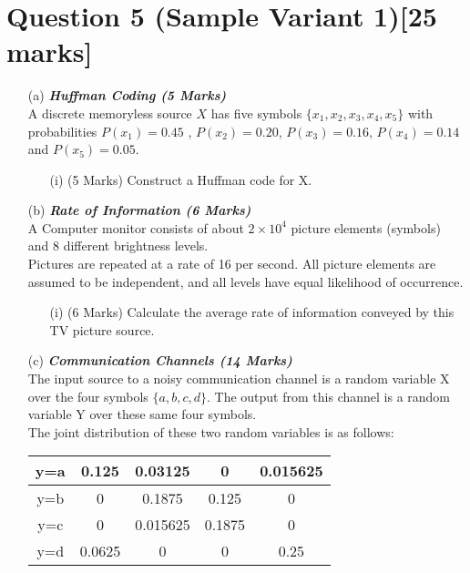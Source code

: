 \documentclass[]{article}
\begin{document}
\section{Question 5 (Sample Variant 1)[25 marks]}

\begin{itemize}
\item[(a)] \textbf{\textit{Huffman Coding (5 Marks)}}\\
A discrete memoryless source $X$ has five symbols $\{x_1,x_2,x_3,x_4,x_5\}$ with probabilities $P(x_1) = 0.45$ , $P(x_2) = 0.20$, $P(x_3) = 0.16$, $P(x_4) = 0.14$ and $P(x_5) = 0.05$.

\begin{itemize}
\item[(i)] (5 Marks) Construct a Huffman code for X.
\end{itemize}

\item[(b)] \textbf{\textit{Rate of Information (6 Marks)}}\\
A Computer monitor consists of about $2 \times 10^4$ picture elements (symbols) and 8
different brightness levels.\\
\newline
Pictures are repeated at a rate of 16 per second. All picture elements
are assumed to be independent, and all levels have equal likelihood of occurrence. 
\begin{itemize}
\item[(i)](6 Marks) Calculate the
average rate of information conveyed by this TV picture source.
\end{itemize}


\item[(c)] \textbf{\textit{Communication Channels (14 Marks)}}\\
The input source to a noisy communication channel is a random variable X over the
four symbols $\{a, b, c, d\}$. The output from this channel is a random variable Y over these same
four symbols. \\
\noindent 
The joint distribution of these two random variables is as follows:\\ 
\begin{center}
\begin{tabular}{|c|c|c|c|c|}
\hline
y=a & 0.125	&	0.03125	&	0	&	0.015625	\\ \hline
y=b & 0	&	0.1875	&	0.125	&	0	\\ \hline
y=c & 0	&	0.015625	&	0.1875	&	0	\\ \hline
y=d & 0.0625	&	0	&	0	&	0.25	\\ \hline
\end{tabular}
\end{center}


\end{itemize}
\end{document}
